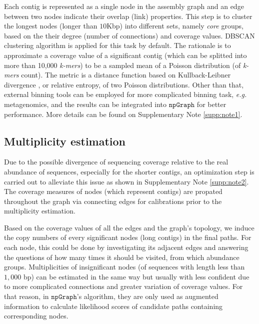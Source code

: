 \documentclass[10pt,twocolumn,twoside]{genpaper}
\newcommand{\npgraph}{$\mathtt{npGraph}$}
\newcommand{\EG}{\emph{e.g.}}
\begin{document}
Each contig is represented as a single node in the assembly graph and an edge between two nodes indicate their overlap (link) properties.
This step is to cluster the longest nodes (longer than $10$Kbp) into different sets, namely \emph{core} groups, based on the their degree (number of connections) and coverage values.
DBSCAN clustering algorithm \cite{Ester96adensity-based} is applied for this task by default.
The rationale is to approximate a coverage value of a significant contig (which can be splitted into more than 10,000 \emph{k-mers}) to be a sampled mean of a Poisson distribution (of \emph{k-mers} count). 
The metric is a distance function based on Kullback-Leibner divergence \cite{Kullback1951information}, or relative entropy, of two Poisson distributions. Other than that, external binning tools can be employed for more complicated binning task, \EG{} metagenomics, and the results can be integrated into \npgraph{} for better performance. More details can be found on Supplementary Note \ref{supp:note1}.

\subsection*{Multiplicity estimation}
Due to the possible divergence of sequencing coverage relative to the real abundance of sequences, especially for the shorter contigs, an optimization step is carried out to alleviate this issue as shown in Supplementary Note \ref{supp:note2}. The coverage measures of nodes (which represent contigs) are propated throughout the graph via connecting edges for calibrations prior to the multiplicity estimation. 

Based on the coverage values of all the edges and the graph's topology, we induce the copy numbers of every significant nodes (long contigs) in the final paths.
For each node, this could be done by investigating its adjacent edges and answering the questions of how many times it should be visited, from which abundance groups.
Multiplicities of insignificant nodes (of sequences with length less than $1,000$ bp) can be estimated in the same way but usually with less confident due to more complicated connections and greater variation of coverage values. 
For that reason, in \npgraph{}'s algorithm, they are only used as augmented information to calculate likelihood scores of candidate paths containing corresponding nodes.

\end{document}
